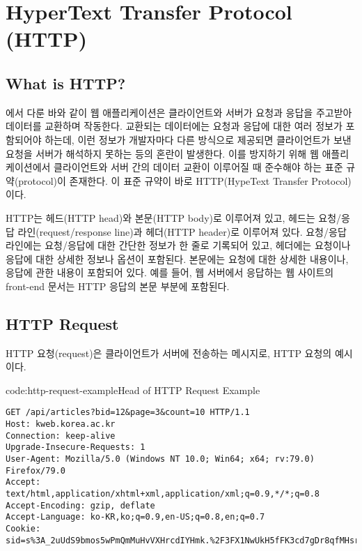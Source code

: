 \section{HyperText Transfer Protocol (HTTP)}\label{sect:hypertext-transfer-protocol}

\subsection*{What is HTTP?}

에서 다룬 바와 같이 웹 애플리케이션은 클라이언트와 서버가 요청과 응답을 주고받아 데이터를 교환하며 작동한다. 교환되는 데이터에는 요청과 응답에 대한 여러 정보가 포함되어야 하는데, 이런 정보가 개발자마다 다른 방식으로 제공되면 클라이언트가 보낸 요청을 서버가 해석하지 못하는 등의 혼란이 발생한다. 이를 방지하기 위해 웹 애플리케이션에서 클라이언트와 서버 간의 데이터 교환이 이루어질 때 준수해야 하는 표준 규약(protocol)이 존재한다. 이 표준 규약이 바로 HTTP(HypeText Transfer Protocol)이다.

HTTP는 헤드(HTTP head)와 본문(HTTP body)로 이루어져 있고, 헤드는 요청/응답 라인(request/response line)과 헤더(HTTP header)로 이루어져 있다. 요청/응답 라인에는 요청/응답에 대한 간단한 정보가 한 줄로 기록되어 있고, 헤더에는 요청이나 응답에 대한 상세한 정보나 옵션이 포함된다. 본문에는 요청에 대한 상세한 내용이나, 응답에 관한 내용이 포함되어 있다. 예를 들어, 웹 서버에서 응답하는 웹 사이트의 front-end 문서는 HTTP 응답의 본문 부분에 포함된다.

\subsection*{HTTP Request}

HTTP 요청(request)은 클라이언트가 서버에 전송하는 메시지로, \은 HTTP 요청의 예시이다.

\begin{codeenv}{code:http-request-example}{Head of HTTP Request Example}\begin{verbatim}
GET /api/articles?bid=12&page=3&count=10 HTTP/1.1
Host: kweb.korea.ac.kr
Connection: keep-alive
Upgrade-Insecure-Requests: 1
User-Agent: Mozilla/5.0 (Windows NT 10.0; Win64; x64; rv:79.0) Firefox/79.0
Accept: text/html,application/xhtml+xml,application/xml;q=0.9,*/*;q=0.8
Accept-Encoding: gzip, deflate
Accept-Language: ko-KR,ko;q=0.9,en-US;q=0.8,en;q=0.7
Cookie: sid=s%3A_2uUdS9bmos5wPmQmMuHvVXHrcdIYHmk.%2F3FX1NwUkH5fFK3cd7gDr8qfMHsrvfMWGSO
\end{verbatim}
\end{codeenv}

